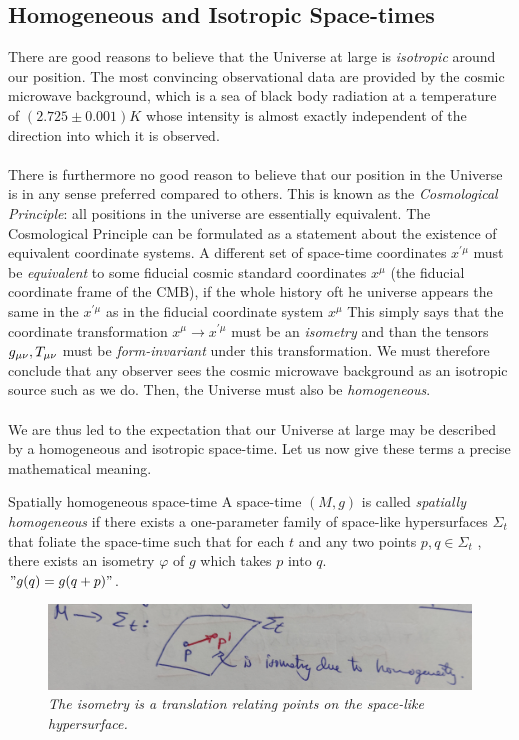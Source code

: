 \subsection{Homogeneous and Isotropic Space-times}
There are good reasons to believe that the Universe at large is \emph{isotropic}
around our position. The most convincing observational data are provided by the cosmic microwave background, which is a sea of black body
radiation at a temperature of $(2.725 ± 0.001) K$ whose intensity is almost
exactly independent of the direction into which it is observed.\\
\\
There is furthermore no good reason to believe that our position in the
Universe is in any sense preferred compared to others.  This is known as the \emph{Cosmological Principle}: all positions in the universe are essentially equivalent. The Cosmological Principle can be formulated as a statement about the existence of equivalent coordinate systems. A different set of space-time coordinates $x^{\prime \mu}$ must be \emph{equivalent} to some fiducial cosmic standard coordinates $x^\mu$ (the fiducial coordinate frame of the CMB), if the whole history oft he universe appears the same in the $x^{\prime \mu}$ as in the fiducial coordinate system $x^\mu$ This simply says that the coordinate transformation $x^\mu\rightarrow x^{\prime\mu}$ must be an \emph{isometry} and than the tensors $g_{\mu \nu}, T_{\mu \nu}$ must be \emph{form-invariant} under this transformation. We must therefore
conclude that any observer sees the cosmic microwave background as an isotropic source such as we do. Then, the Universe must also be
\emph{homogeneous}.\\
\\
We are thus led to the expectation that our Universe at large may be
described by a homogeneous and isotropic space-time. Let us now give
these terms a precise mathematical meaning.
\begin{mybox}{Spatially homogeneous space-time}
	A space-time $(M, g)$ is called \emph{spatially homogeneous} if there exists a
	one-parameter family of space-like hypersurfaces $\Sigma_t$ that foliate the
	space-time such that for each $t$ and any two points $p, q ∈ \Sigma_t$ , there exists
	an isometry $φ$ of $g$ which takes $p$ into $q$.\\
	$"g(q) = g(q+p)"$.
\end{mybox}
\begin{figure}[h!]
	\centering
	\includegraphics[width=0.7\linewidth]{gfx/HomogeneousSpacetime}
	\caption{\itshape The isometry is a translation relating points on the space-like hypersurface.}
	\label{fig:homogeneousspacetime}
\end{figure}




